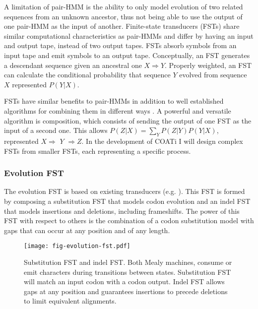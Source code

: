 A limitation of pair-HMM is the ability to only model evolution of two related
sequences from an unknown ancestor, thus not being able to use the output of one
pair-HMM as the input of another.
Finite-state transducers (FSTs) share similar computational characteristics as
pair-HMMs and differ by having an input and output tape, instead of two output
tapes.
FSTs absorb symbols from an input tape and emit symbols to an output tape.
Conceptually, an FST generates a descendant sequence given an ancestral one
$X \Rightarrow Y$.
Properly weighted, an FST can calculate the conditional probability that
sequence $Y$ evolved from sequence $X$ represented $P(Y|X)$.

FSTs have similar benefits to pair-HMMs in addition to well established
algorithms for combining them in different ways
\parencite{bradley2007transducers}.
A powerful and versatile algorithm is composition, which consists of sending the
output of one FST as the input of a second one.
This allows $P(Z|X) = \sum_Y P(Z|Y) P(Y|X)$, represented $X \Rightarrow$
$Y$ $\Rightarrow Z$.
In the development of COATi I will design complex FSTs from smaller FSTs, each
representing a specific process.

\subsubsection{Evolution FST}

The evolution FST is based on existing transducers
(e.g. \cite{holmes2001evolutionary}).
This FST is formed by composing a substitution FST that models codon
evolution and an indel FST that models insertions and deletions, including
frameshifts.
The power of this FST with respect to others is the combination of a codon
substitution model with gaps that can occur at any position and of any length.

\begin{figure}[h]
\centering
    \texttt{[image: fig-evolution-fst.pdf]}
    \caption{Substitution FST and indel FST. Both Mealy machines, consume or
    emit characters during transitions between states. Substitution FST will
    match an input codon with a codon output.
    Indel FST allows gaps at any position and guarantees insertions to precede
    deletions to limit equivalent alignments.}
    \label{fig:evolution-fst}
\end{figure}

\vspace{2em}

